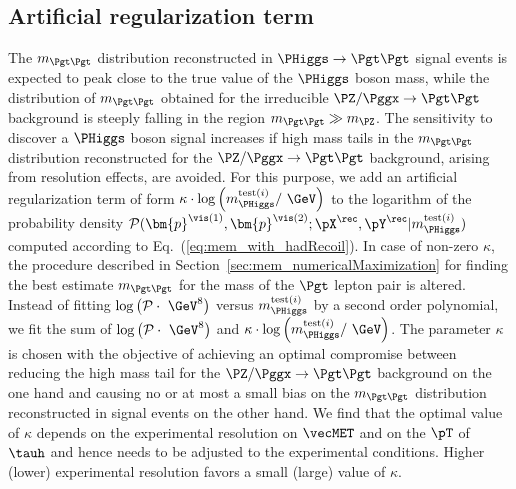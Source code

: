 \subsection{Artificial regularization term}
\label{sec:mem_logM}

The $m_{\Pgt\Pgt}$ distribution reconstructed in $\PHiggs \to \Pgt\Pgt$ signal events is expected to peak close to the true value of the $\PHiggs$ boson mass,
while the distribution of $m_{\Pgt\Pgt}$ obtained for the irreducible
$\PZ/\Pggx \to \Pgt\Pgt$ background is steeply falling in the region
$m_{\Pgt\Pgt} \gg m_{\PZ}$.
The sensitivity to discover a $\PHiggs$ boson signal increases if high mass tails in the $m_{\Pgt\Pgt}$ distribution reconstructed 
for the $\PZ/\Pggx \to \Pgt\Pgt$ background, arising from resolution effects, are avoided.
For this purpose,
we add an artificial regularization term of form 
$\kappa \cdot \log \left( m_{\PHiggs}^{\textrm{test}(i)} / \mbox{~\GeV} \right)$ 
to the logarithm of the probability density $\mathcal{P}(\bm{p}^{\vis(1)},\bm{p}^{\vis(2)};\pX^{\rec},\pY^{\rec}|m_{\PHiggs}^{\textrm{test}(i)})$
computed according to Eq.~(\ref{eq:mem_with_hadRecoil}).
In case of non-zero $\kappa$,
the procedure described in Section~\ref{sec:mem_numericalMaximization} for finding the best estimate $m_{\Pgt\Pgt}$ for the mass of the $\Pgt$ lepton pair is altered.
Instead of fitting 
$\log \left( \mathcal{P} \cdot \mbox{~\GeV}^{8} \right)$ 
versus $m_{\PHiggs}^{\textrm{test}(i)}$ by a second order polynomial,
we fit the sum of $\log \left( \mathcal{P} \cdot \mbox{~\GeV}^{8} \right)$
and $\kappa \cdot \log \left( m_{\PHiggs}^{\textrm{test}(i)} / \mbox{~\GeV} \right)$.
The parameter $\kappa$ is chosen with the objective of achieving an
optimal compromise between reducing the high mass tail for the
$\PZ/\Pggx \to \Pgt\Pgt$ background on the one hand and 
causing no or at most a small bias on the $m_{\Pgt\Pgt}$ distribution
reconstructed in signal events on the other hand.
We find that the optimal value of $\kappa$ depends on the experimental
resolution on $\vecMET$ and on the $\pT$ of $\tauh$ and hence needs to be adjusted to the experimental conditions.
Higher (lower) experimental resolution favors a small (large) value of $\kappa$. 
